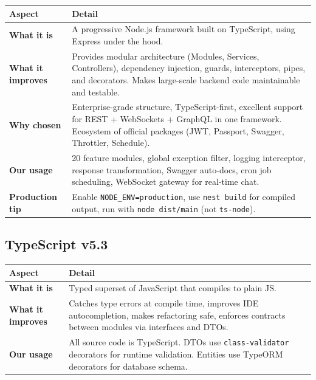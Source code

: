\documentclass[a4paper,11pt]{article}
\begin{document}
\begin{longtable}{L{3.5cm} L{11.5cm}}
\toprule
\textbf{Aspect} & \textbf{Detail} \\
\midrule
\endhead
\textbf{What it is} & A progressive Node.js framework built on TypeScript, using Express under the hood. \\
\midrule
\textbf{What it improves} & Provides modular architecture (Modules, Services, Controllers), dependency injection, guards, interceptors, pipes, and decorators. Makes large-scale backend code maintainable and testable. \\
\midrule
\textbf{Why chosen} & Enterprise-grade structure, TypeScript-first, excellent support for REST + WebSockets + GraphQL in one framework. Ecosystem of official packages (JWT, Passport, Swagger, Throttler, Schedule). \\
\midrule
\textbf{Our usage} & 20 feature modules, global exception filter, logging interceptor, response transformation, Swagger auto-docs, cron job scheduling, WebSocket gateway for real-time chat. \\
\midrule
\textbf{Production tip} & Enable \texttt{NODE\_ENV=production}, use \texttt{nest build} for compiled output, run with \texttt{node dist/main} (not \texttt{ts-node}). \\
\bottomrule
\end{longtable}

\subsection{TypeScript v5.3}

\begin{longtable}{L{3.5cm} L{11.5cm}}
\toprule
\textbf{Aspect} & \textbf{Detail} \\
\midrule
\endhead
\textbf{What it is} & Typed superset of JavaScript that compiles to plain JS. \\
\midrule
\textbf{What it improves} & Catches type errors at compile time, improves IDE autocompletion, makes refactoring safe, enforces contracts between modules via interfaces and DTOs. \\
\midrule
\textbf{Our usage} & All source code is TypeScript. DTOs use \texttt{class-validator} decorators for runtime validation. Entities use TypeORM decorators for database schema. \\
\bottomrule
\end{longtable}

\end{document}
